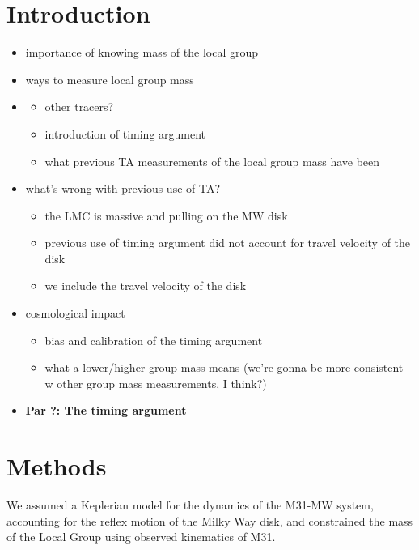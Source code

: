 \documentclass[twocolumn]{aastex631}
\begin{document}
\section{Introduction}
\label{sec:intro}

\begin{itemize}
    \item importance of knowing mass of the local group
    \item ways to measure local group mass
    \item \begin{itemize}
            \item other tracers? 
            \item introduction of timing argument 
            \item what previous TA measurements of the local group mass have been
          \end{itemize}
    \item what's wrong with previous use of TA?
        \begin{itemize}
            \item the LMC is massive and pulling on the MW disk
            \item previous use of timing argument did not account for travel velocity of the disk
            \item we include the travel velocity of the disk
        \end{itemize}
    \item cosmological impact
        \begin{itemize}
            \item bias and calibration of the timing argument 
            \item what a lower/higher group mass means (we're gonna be more consistent w other group mass measurements, I think?)
        \end{itemize}
    \item\textbf{Par ?: The timing argument }
    
\end{itemize}

\section{Methods}\label{sec:methods}
We assumed a Keplerian model for the dynamics of the M31-MW system, accounting for the reflex motion of the Milky Way disk, and constrained the mass of the Local Group using observed kinematics of M31.  
\end{document}
